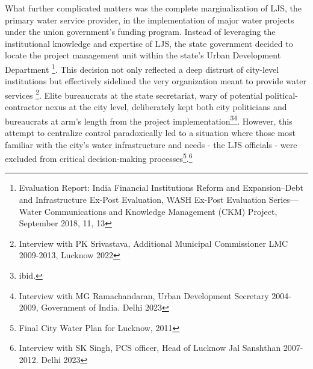 What further complicated matters was the complete marginalization of LJS, the primary water service provider, in the implementation of major water projects under the union government's funding program. Instead of leveraging the institutional knowledge and expertise of LJS, the state government decided to locate the project management unit within the state's Urban Development Department \footnote{Evaluation Report: India Financial Institutions Reform and Expansion–Debt and Infrastructure Ex-Post Evaluation, WASH Ex-Post Evaluation Series—Water Communications and Knowledge Management (CKM) Project, September 2018, 11, 13}. This decision not only reflected a deep distrust of city-level institutions but effectively sidelined the very organization meant to provide water services \footnote{Interview with PK Srivastava, Additional Municipal Commissioner LMC 2009-2013, Lucknow 2022
}. Elite bureaucrats at the state secretariat, wary of potential political-contractor nexus at the city level, deliberately kept both city politicians and bureaucrats at arm's length from the project implementation\footnote{ibid.}\footnote{Interview with MG Ramachandaran, Urban Development Secretary 2004-2009, Government of India. Delhi 2023}. However, this attempt to centralize control paradoxically led to a situation where those most familiar with the city's water infrastructure and needs - the LJS officials - were excluded from critical decision-making processes\footnote{Final City Water Plan for Lucknow, 2011}.\footnote{Interview with SK Singh, PCS officer, Head of Lucknow Jal Sanshthan 2007-2012. Delhi 2023
}

